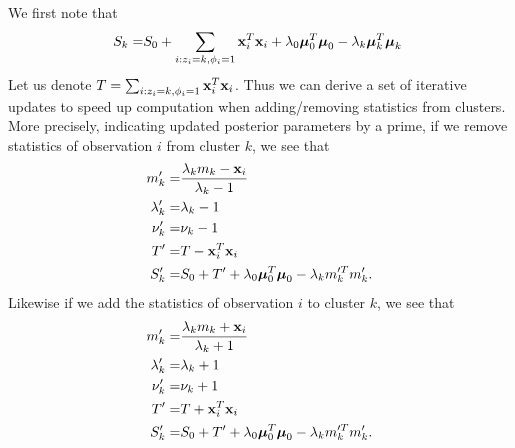 \documentclass[12pt,english]{article}
\begin{document}
We first note that
\begin{equation}
\begin{split}
S_k = & S_0 + \sum_{i:z_i = k, \phi_i = 1}{\bf x}_i^{T}{\bf x}_i + \lambda_0\boldsymbol{\mu}_0^T\boldsymbol{\mu}_0 - \lambda_k\boldsymbol{\mu}_k^T \boldsymbol{\mu}_k \ \\
\end{split}
\end{equation}
Let us denote $T = \sum_{i:z_i = k, \phi_i = 1}{\bf x}_i^{T}{\bf x}_i$. Thus we can derive a set of iterative updates to speed up computation when adding/removing statistics from clusters. More precisely, indicating updated posterior parameters by a prime, if we remove statistics of observation $i$ from cluster $k$, we see that
\begin{equation}
\begin{split}
m'_k = & \frac{\lambda_k m_k - {\bf x}_i}{\lambda_k - 1}\\
\lambda'_k = & \lambda_k -1\\
\nu'_k = & \nu_k -1  \\
T' = & T - {\bf x}_i^T{\bf x}_i \\
S'_k = & S_0 + T' + \lambda_0\boldsymbol{\mu}_0^T\boldsymbol{\mu}_0 - \lambda_km_k'^T m_k'. \\
\end{split}
\end{equation}
Likewise if we add the statistics of observation $i$ to cluster $k$, we see that
\begin{equation}
\begin{split}
m'_k = & \frac{\lambda_k m_k + {\bf x}_i}{\lambda_k + 1}\\
\lambda'_k = & \lambda_k +1\\
\nu'_k = & \nu_k +1  \\
T' = & T + {\bf x}_i^T{\bf x}_i \\
S'_k = & S_0 + T' + \lambda_0\boldsymbol{\mu}_0^T\boldsymbol{\mu}_0 - \lambda_km_k'^T m_k'.\\
\end{split}
\end{equation}

\clearpage
\end{document}
